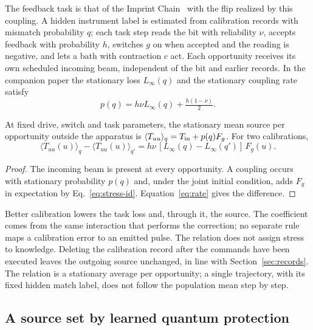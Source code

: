 The feedback task is that of the Imprint Chain~\cite{Liu2026Chain} with the flip realized by this coupling. A hidden instrument label is estimated from calibration records with mismatch probability $q$; each task step reads the bit with reliability $\nu$, accepts feedback with probability $h$, switches $g$ on when accepted and the reading is negative, and lets a bath with contraction $c$ act. Each opportunity receives its own scheduled incoming beam, independent of the bit and earlier records. In the companion paper the stationary loss $L_\infty(q)$ and the stationary coupling rate satisfy~\cite{Liu2026QRAIFB}
\begin{equation}
p(q)=h\nu L_\infty(q)+\tfrac{h(1-\nu)}2 .
\label{eq:rate}
\end{equation}

\begin{proposition}
\label{prop:source-loss}
At fixed drive, switch and task parameters, the stationary mean source per opportunity outside the apparatus is $\langle T_{uu}\rangle_q=T_{\rm in}+p(q)F_g$. For two calibrations,
\begin{equation}
\langle T_{uu}(u)\rangle_q-\langle T_{uu}(u)\rangle_{q'}=h\nu\,[L_\infty(q)-L_\infty(q')]\,F_g(u).
\label{eq:source-loss}
\end{equation}
\end{proposition}

\begin{proof}
The incoming beam is present at every opportunity. A coupling occurs with stationary probability $p(q)$ and, under the joint initial condition, adds $F_g$ in expectation by Eq.~\eqref{eq:stress-id}. Equation~\eqref{eq:rate} gives the difference.
\end{proof}

Better calibration lowers the task loss and, through it, the source. The coefficient comes from the same interaction that performs the correction; no separate rule maps a calibration error to an emitted pulse. The relation does not assign stress to knowledge. Deleting the calibration record after the commands have been executed leaves the outgoing source unchanged, in line with Section~\ref{sec:records}. The relation is a stationary average per opportunity; a single trajectory, with its fixed hidden match label, does not follow the population mean step by step.

\subsection{A source set by learned quantum protection}
\label{sec:learned-protection-source}

